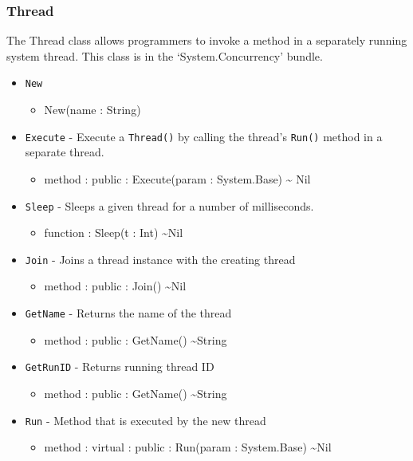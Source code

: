 \documentclass[11pt]{article}
\begin{document}
\subsubsection{Thread}
The Thread class allows programmers to invoke a method in a separately
running system thread.  This class is in the `System.Concurrency'
bundle.
\begin{itemize}
\item \texttt{New}
  \begin{itemize}
  \item New(name : String)
  \end{itemize}
\item \texttt{Execute} - Execute a \texttt{Thread()} by calling the
  thread's \texttt{Run()} method in a separate thread.
  \begin{itemize}
  \item method : public : Execute(param : System.Base) \textasciitilde
    Nil
  \end{itemize}
\item \texttt{Sleep} - Sleeps a given thread for a number of
  milliseconds.
  \begin{itemize}
  \item function : Sleep(t : Int) \textasciitilde Nil
  \end{itemize}
\item \texttt{Join} - Joins a thread instance with the creating thread
  \begin{itemize}
  \item method : public : Join() \textasciitilde Nil
  \end{itemize}
\item \texttt{GetName} - Returns the name of the thread
  \begin{itemize}
  \item method : public : GetName() \textasciitilde String
  \end{itemize}
\item \texttt{GetRunID} - Returns running thread ID
  \begin{itemize}
  \item method : public : GetName() \textasciitilde String
  \end{itemize}
\item \texttt{Run} - Method that is executed by the new thread
  \begin{itemize}
  \item method : virtual : public : Run(param : System.Base)
    \textasciitilde Nil
  \end{itemize}
\end{itemize}
\end{document}
